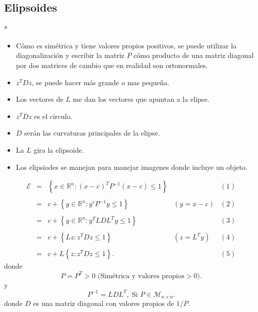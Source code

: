 \begin{paracol}{2}
\section{Elipsoides}

\switchcolumn[1]*{\scriptsize
    \begin{itemize}
	\item Cómo es simétrica y tiene valores propios positivos, se puede utilizar la diagonalización y escribir la matriz $P$ cómo producto de una matriz diagonal por dos matrices de cambio que en realidad son ortonormales.
	\item $z^TDz$, se puede hacer más grande o mas pequeña.
	\item Los vectores de $L$ me dan los vectores que apuntan a la elipse.
	\item $z^TDz$ es el circulo.
	\item $D$ serán las curvaturas principales de la elipse.
	\item La $L$ gira la elipsoide.
	\item Los elipsiodes se manejan para manejar imagenes donde incluye un objeto.
    \end{itemize}
}
\switchcolumn[0]\noindent
$$
\begin{array}{rcllc}
    \mathcal{E}&=&\left\{x\in \mathbb{R}^n : (x-c)^TP^{-1} (x-c)\leq 1\right\}&&(1)\\\\
	       &=& c+\left\{y\in \mathbb{R}^n : y^r P^{-1} y \leq 1\right\} & (y=x-c)&(2)\\\\
	       &=&c+\left\{y\in \mathbb{R}^n : y^T L D L^T y \leq 1\right\}&&(3)\\\\
	       &=&c+\left\{Lz : z^T D z \leq 1\right\} & (z=L^Ty)&(4)\\\\
	       &=& c+L\left\{z:z^TDz\leq 1\right\}. &&(5)
\end{array}
$$
donde 
$$P=P^T>0 \text{ (Simétrica y valores propios}>0).$$
y
$$P^{-1}=LDL^T,\; \text{Si } P\in \mathcal{M}_{n\times n}.$$
donde $D$ es una matriz diagonal con valores propios de $1/P$.

\begin{center}
\end{center}
\end{paracol}
